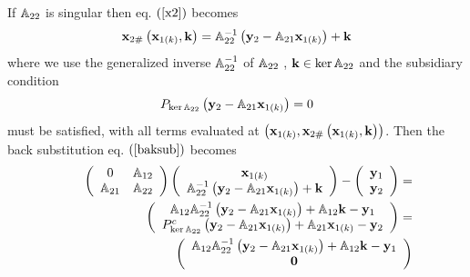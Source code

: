 If ${\Bbb A}_{22}$ is singular then eq. $\left( \ref{x2}\right) $ becomes%
\begin{equation}
{\bf x}_{2\#}\left( {\bf x}_{1\left( k\right) },{\bf k}\right) ={\Bbb A}%
_{22}^{-1}\left( {\bf y}_{2}-{\Bbb A}_{21}{\bf x}_{1\left( k\right) }\right)
+{\bf k}  \label{x2eq}
\end{equation}%
where we use the generalized inverse ${\Bbb A}_{22}^{-1}$ of ${\Bbb A}_{22}$%
, ${\bf k}\in \ker {\Bbb A}_{22}$ and the subsidiary condition 
\begin{equation}
P_{\ker {\Bbb A}_{22}}\left( {\bf y}_{2}-{\Bbb A}_{21}{\bf x}_{1\left(
k\right) }\right) =0  \label{x2cond}
\end{equation}%
must be satisfied, with all terms evaluated at $\left( {\bf x}_{1\left(
k\right) },{\bf x}_{2\#}\left( {\bf x}_{1\left( k\right) },{\bf k}\right)
\right) $. Then the back substitution eq. $\left( \ref{baksub}\right) $
becomes 
\begin{eqnarray}
&&\left( 
\begin{array}{cc}
0 & {\Bbb A}_{12} \\ 
{\Bbb A}_{21} & {\Bbb A}_{22}%
\end{array}%
\right) \left( 
\begin{array}{c}
{\bf x}_{1\left( k\right) } \\ 
{\Bbb A}_{22}^{-1}\left( {\bf y}_{2}-{\Bbb A}_{21}{\bf x}_{1\left( k\right)
}\right) +{\bf k}%
\end{array}%
\right) -\left( 
\begin{array}{c}
{\bf y}_{1} \\ 
{\bf y}_{2}%
\end{array}%
\right) =  \nonumber \\
&&\qquad \left( 
\begin{array}{c}
{\Bbb A}_{12}{\Bbb A}_{22}^{-1}\left( {\bf y}_{2}-{\Bbb A}_{21}{\bf x}%
_{1\left( k\right) }\right) +{\Bbb A}_{12}{\bf k}-{\bf y}_{1} \\ 
P_{\ker {\Bbb A}_{22}}^{c}\left( {\bf y}_{2}-{\Bbb A}_{21}{\bf x}_{1\left(
k\right) }\right) +{\Bbb A}_{21}{\bf x}_{1\left( k\right) }-{\bf y}_{2}%
\end{array}%
\right) =  \nonumber \\
&&\qquad \qquad \qquad \qquad \left( 
\begin{array}{c}
{\Bbb A}_{12}{\Bbb A}_{22}^{-1}\left( {\bf y}_{2}-{\Bbb A}_{21}{\bf x}%
_{1\left( k\right) }\right) +{\Bbb A}_{12}{\bf k}-{\bf y}_{1} \\ 
{\bf 0}%
\end{array}%
\right)  \label{subbak}
\end{eqnarray}%

